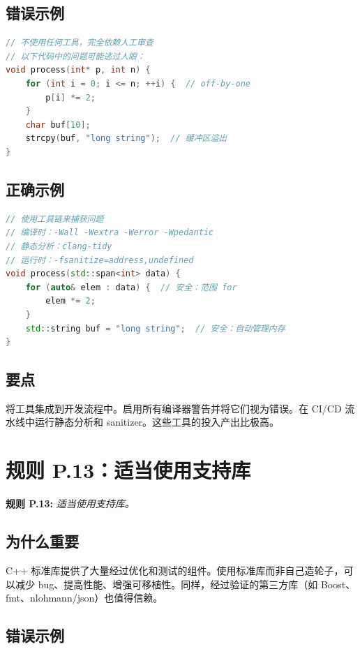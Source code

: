 \subsection{错误示例}

\begin{lstlisting}[language=C++]
// 不使用任何工具，完全依赖人工审查
// 以下代码中的问题可能逃过人眼：
void process(int* p, int n) {
    for (int i = 0; i <= n; ++i) {  // off-by-one
        p[i] *= 2;
    }
    char buf[10];
    strcpy(buf, "long string");  // 缓冲区溢出
}
\end{lstlisting}

\subsection{正确示例}

\begin{lstlisting}[language=C++]
// 使用工具链来捕获问题
// 编译时：-Wall -Wextra -Werror -Wpedantic
// 静态分析：clang-tidy
// 运行时：-fsanitize=address,undefined
void process(std::span<int> data) {
    for (auto& elem : data) {  // 安全：范围 for
        elem *= 2;
    }
    std::string buf = "long string";  // 安全：自动管理内存
}
\end{lstlisting}

\subsection{要点}
将工具集成到开发流程中。启用所有编译器警告并将它们视为错误。在 CI/CD 流水线中运行静态分析和 sanitizer。这些工具的投入产出比极高。

\section{规则 P.13：适当使用支持库}

\textbf{规则 P.13:} \textit{适当使用支持库。}

\subsection{为什么重要}

C++ 标准库提供了大量经过优化和测试的组件。使用标准库而非自己造轮子，可以减少 bug、提高性能、增强可移植性。同样，经过验证的第三方库（如 Boost、fmt、nlohmann/json）也值得信赖。

\subsection{错误示例}

